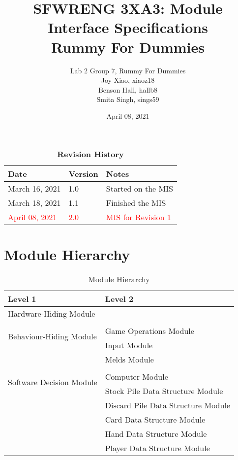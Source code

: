 \documentclass[12pt, titlepage]{article}
\title{SFWRENG 3XA3: Module Interface Specifications\\Rummy For Dummies}
\author{Lab 2 Group 7, Rummy For Dummies
		\\ Joy Xiao, xiaoz18
		\\ Benson Hall, hallb8
		\\ Smita Singh, sings59
}
\date{April 08, 2021}
\begin{document}
\maketitle

\newpage
\begin{table}[h!]
    \caption{\bf Revision History}
    \begin{tabularx}{\textwidth}{p{3cm}p{2cm}X}
        \toprule {\bf Date} & {\bf Version} & {\bf Notes}\\
        \midrule
        March 16, 2021 & 1.0 & Started on the MIS\\
        March 18, 2021 & 1.1 & Finished the MIS\\
        \textcolor{red}{April 08, 2021} & \textcolor{red}{2.0} & \textcolor{red}{MIS for Revision 1} \\
        \bottomrule
    \end{tabularx}
\end{table}

\section{Module Hierarchy}
\begin{table}[h!]
    \centering
    \begin{tabular}{p{} p{}}
        \toprule
        \textbf{Level 1} & \textbf{Level 2}\\
        \midrule
        
        {Hardware-Hiding Module} & ~ \\
        \midrule
        
        \multirow{3}{0.3\textwidth}{Behaviour-Hiding Module}\\
        & Game Operations Module\\
        & Input Module\\
        & Melds Module\\
        \midrule
        
        \multirow{3}{0.3\textwidth}{Software Decision Module}\\
        & Computer Module\\
        & Stock Pile Data Structure Module\\
        & Discard Pile Data Structure Module\\
        & Card Data Structure Module\\
        & Hand Data Structure Module\\
        & Player Data Structure Module\\
        \bottomrule
        
    \end{tabular}
    \caption{Module Hierarchy}
    \label{TblMH}
\end{table}
\end{document}
